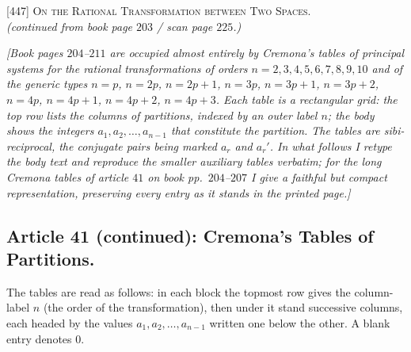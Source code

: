 \documentclass[11pt]{article}
\begin{document}

\begin{center}
\textsc{[447] On the Rational Transformation between Two Spaces.}\\[2pt]
\textit{(continued from book page $203$ / scan page $225$.)}
\end{center}

\bigskip

\noindent\textit{[Book pages $204$--$211$ are occupied almost entirely by
Cremona's tables of principal systems for the rational transformations of
orders $n=2,3,4,5,6,7,8,9,10$ and of the generic types $n=p$, $n=2p$,
$n=2p+1$, $n=3p$, $n=3p+1$, $n=3p+2$, $n=4p$, $n=4p+1$, $n=4p+2$,
$n=4p+3$. Each table is a rectangular grid: the top row lists the columns
of partitions, indexed by an outer label $n$; the body shows the integers
$a_{1},a_{2},\ldots,a_{n-1}$ that constitute the partition. The tables
are sibi-reciprocal, the conjugate pairs being marked $a_{r}$ and
$a_{r}'$. In what follows I retype the body text and reproduce the smaller
auxiliary tables verbatim; for the long Cremona tables of article $41$ on
book pp.~$204$--$207$ I give a faithful but compact representation,
preserving every entry as it stands in the printed page.]}

\bigskip


\subsection*{Article 41 (continued): Cremona's Tables of Partitions.}

\noindent The tables are read as follows: in each block the topmost row
gives the column-label $n$ (the order of the transformation), then under
it stand successive columns, each headed by the values
$a_{1},a_{2},\ldots,a_{n-1}$ written one below the other. A blank entry
denotes $0$.
\end{document}
